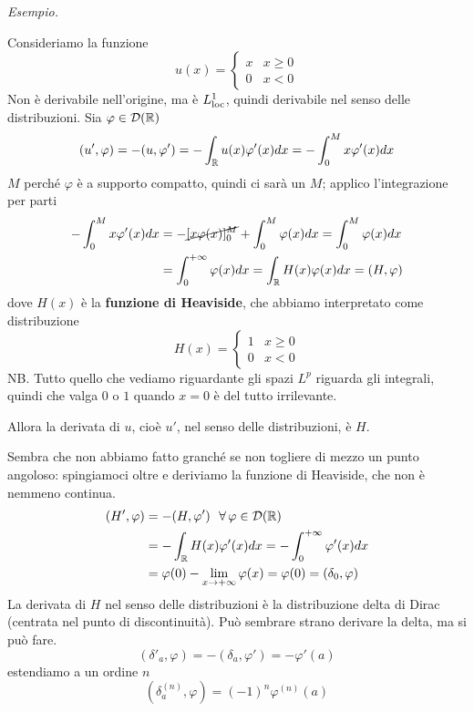 \textit{Esempio.}

Consideriamo la funzione
\begin{equation*}
u(x) =
\begin{cases}
x & x \geq 0\\
0 & x < 0
\end{cases}
\end{equation*}
Non è derivabile nell'origine, ma è $L^{1}_{\operatorname{loc}}$, quindi derivabile nel senso delle distribuzioni. Sia $\varphi \in \mathcal{D}(\mathbb{R})$
\begin{equation*}
(u', \varphi) = - (u, \varphi') = - \int_{\mathbb{R}} u(x) \varphi'(x) dx = - \int^{M}_{0} x\varphi'(x) dx
\end{equation*}
$M$ perché $\varphi $ è a supporto compatto, quindi ci sarà un $M$; applico l'integrazione per parti
\begin{align*}
- \int^{M}_{0} x\varphi'(x) dx & = - \cancel{[x\varphi (x)]^{M}_{0}} + \int^{M}_{0} \varphi (x) dx = \int^{M}_{0} \varphi (x) dx\\
 & = \int^{+ \infty}_{0} \varphi (x) dx = \int_{\mathbb{R}} H(x) \varphi (x) dx = (H, \varphi)
\end{align*}
dove $H(x)$ è la \textbf{funzione di Heaviside}, che abbiamo interpretato come distribuzione
\begin{equation*}
H(x) =
\begin{cases}
1 & x \geq 0\\
0 & x < 0
\end{cases}
\end{equation*}
NB. Tutto quello che vediamo riguardante gli spazi $L^{p}$ riguarda gli integrali, quindi che valga $0$ o $1$ quando $x = 0$ è del tutto irrilevante.

Allora la derivata di $u$, cioè $u'$, nel senso delle distribuzioni, è $H$.

Sembra che non abbiamo fatto granché se non togliere di mezzo un punto angoloso: spingiamoci oltre e deriviamo la funzione di Heaviside, che non è nemmeno continua.
\begin{align*}
(H', \varphi) & = - (H, \varphi') \ \ \forall \varphi \in \Dc(\RR)\\
 & = - \int_{\RR} H(x) \varphi'(x) dx = - \int^{+ \infty}_{0} \varphi'(x) dx\\
 & = \varphi (0) - \lim_{x\rightarrow + \infty} \varphi (x) = \varphi (0) = (\delta_{0}, \varphi)
\end{align*}
La derivata di $H$ nel senso delle distribuzioni è la distribuzione delta di Dirac (centrata nel punto di discontinuità). Può sembrare strano derivare la delta, ma si può fare.
\begin{equation*}
(\delta'_{a}, \varphi) = - (\delta_{a}, \varphi') = - \varphi'(a)
\end{equation*}
estendiamo a un ordine $n$
\begin{equation*}
\left(\delta^{(n)}_{a}, \varphi \right) = (- 1)^{n} \varphi^{(n)}(a)
\end{equation*}

